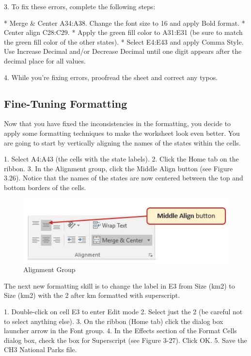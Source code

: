 3. To fix these errors, complete the following steps:


* Merge \& Center A34:A38. Change the font size to 16 and apply Bold format.
* Center align C28:C29.
* Apply the green fill color to A31:E31 (be sure to match the green fill color of the other states).
* Select E4:E43 and apply Comma Style. Use Increase Decimal and/or Decrease Decimal until one digit appears after the decimal place for all values.

4. While you're fixing errors, proofread the sheet and correct any typos.

\subsection{Fine-Tuning Formatting}

Now that you have fixed the inconsistencies in the formatting, you decide to apply some formatting
techniques to make the worksheet look even better. You are going to start by vertically aligning the
names of the states within the cells.

1. Select A4:A43 (the cells with the state labels).
2. Click the Home tab on the ribbon.
3. In the Alignment group, click the Middle Align button (see Figure 3.26). Notice that the names
of the states are now centered between the top and bottom borders of the cells.


\begin{figure}[H]
	\centering
	\includegraphics[width=\maxwidth{.95\linewidth}]{gfx/ch03_fig27}
	\caption{Alignment Group}
	\label{03:fig27}
\end{figure}



The next new formatting skill is to change the label in E3 from Size (km2) to Size (km2) with the 2
after km formatted with superscript.

1. Double-click on cell E3 to enter Edit mode
2. Select just the 2 (be careful not to select anything else).
3. On the ribbon (Home tab) click the dialog box launcher arrow in the Font group.
4. In the Effects section of the Format Cells dialog box, check the box for Superscript (see Figure
3-27). Click OK.
5. Save the CH3 National Parks file.




